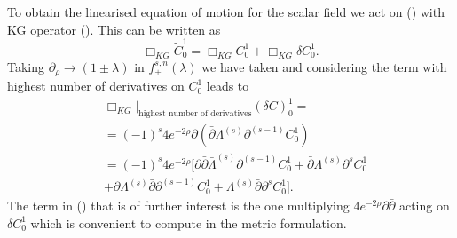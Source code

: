 \documentclass[prd,superscriptaddress,twocolumn,10pt]{revtex4}
\begin{document}
To obtain the linearised equation of motion for the scalar field we act on () with KG operator ().
This can be written as
\begin{equation}
\Box_{KG}\tilde{C}^1_0=\Box_{KG}C_0^1+\Box_{KG}\delta C_0^1 .
\end{equation}
Taking   $\partial_{\rho}\rightarrow(1\pm\lambda)$ in $f_{\pm}^{s,n}(\lambda)$ we have taken and considering the term with highest number of derivatives on $C_0^1$  leads to
\begin{align}
&\Box_{KG}|_{\text{highest number of derivatives}}(\delta C)_0^1=\\& = (-1)^s4e^{-2\rho}\partial(\bar{\partial}\Lambda^{(s)}\partial^{(s-1)}C_0^1)\\&=(-1)^s4e^{-2\rho}[ \partial\bar{\partial}\bar{\Lambda}^{(s)}\partial^{(s-1)}C_0^1+\bar{\partial}\Lambda^{(s)}\partial^{s}C_0^1\nonumber\\&+\partial\Lambda^{(s)}\bar{\partial}\partial^{(s-1)}C_0^1+\Lambda^{(s)}\bar{\partial}\partial^sC_0^1 ].
\end{align}
The term in () that is of further interest is the one multiplying $4e^{-2\rho}\partial\bar{\partial}$ acting on $\delta C_0^1$ which is convenient to compute in the metric formulation.
\end{document}
